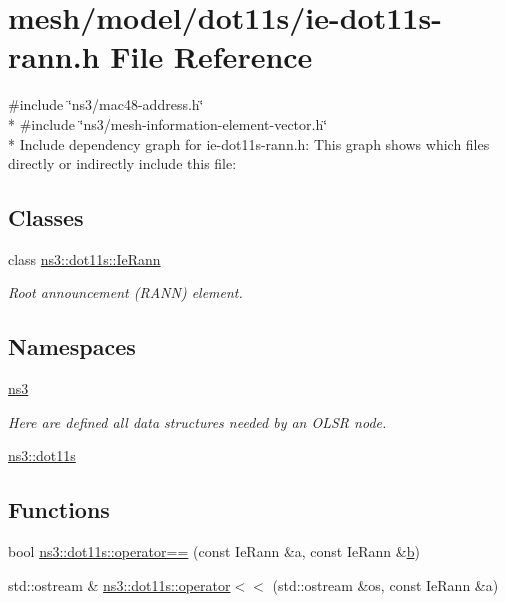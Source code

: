 \hypertarget{ie-dot11s-rann_8h}{}\section{mesh/model/dot11s/ie-\/dot11s-\/rann.h File Reference}
\label{ie-dot11s-rann_8h}
{\ttfamily \#include \char`\"{}ns3/mac48-\/address.\+h\char`\"{}}\\*
{\ttfamily \#include \char`\"{}ns3/mesh-\/information-\/element-\/vector.\+h\char`\"{}}\\*
Include dependency graph for ie-\/dot11s-\/rann.h\+:
This graph shows which files directly or indirectly include this file\+:
\subsection*{Classes}
\begin{DoxyCompactItemize}
\item 
class \hyperlink{classns3_1_1dot11s_1_1IeRann}{ns3\+::dot11s\+::\+Ie\+Rann}
\begin{DoxyCompactList}\small\item\em Root announcement (R\+A\+NN) element. \end{DoxyCompactList}\end{DoxyCompactItemize}
\subsection*{Namespaces}
\begin{DoxyCompactItemize}
\item 
 \hyperlink{namespacens3}{ns3}
\begin{DoxyCompactList}\small\item\em Here are defined all data structures needed by an O\+L\+SR node. \end{DoxyCompactList}\item 
 \hyperlink{namespacens3_1_1dot11s}{ns3\+::dot11s}
\end{DoxyCompactItemize}
\subsection*{Functions}
\begin{DoxyCompactItemize}
\item 
bool \hyperlink{namespacens3_1_1dot11s_aa1e9174cea8c71e08b32545c8446fe8a}{ns3\+::dot11s\+::operator==} (const Ie\+Rann \&a, const Ie\+Rann \&\hyperlink{lte__pathloss_8m_a21ad0bd836b90d08f4cf640b4c298e7c}{b})
\item 
std\+::ostream \& \hyperlink{namespacens3_1_1dot11s_ab3f0282bfa1e20f94cf62dde642817df}{ns3\+::dot11s\+::operator$<$$<$} (std\+::ostream \&os, const Ie\+Rann \&a)
\end{DoxyCompactItemize}
